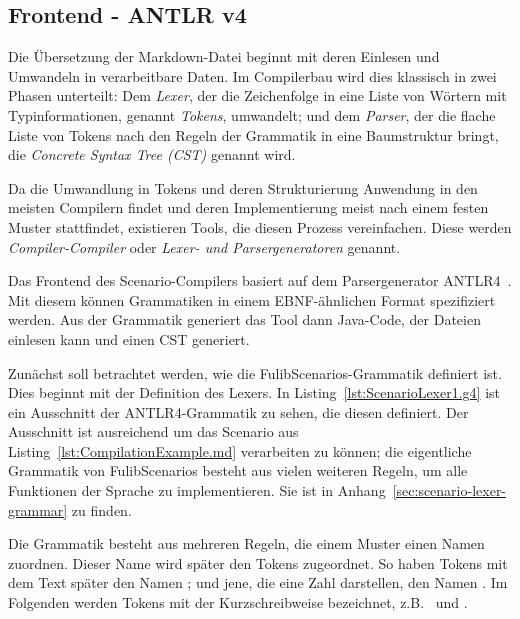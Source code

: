 \subsection{Frontend - ANTLR v4}\label{subsec:frontend-antlr4}

Die Übersetzung der Markdown-Datei beginnt mit deren Einlesen und Umwandeln in verarbeitbare Daten.
Im Compilerbau wird dies klassisch in zwei Phasen unterteilt:
Dem \emph{Lexer}, der die Zeichenfolge in eine Liste von Wörtern mit Typinformationen, genannt \emph{Tokens}, umwandelt;
und dem \emph{Parser}, der die flache Liste von Tokens nach den Regeln der Grammatik in eine Baumstruktur bringt,
die \emph{Concrete Syntax Tree (CST)} genannt wird.

Da die Umwandlung in Tokens und deren Strukturierung Anwendung in den meisten Compilern findet
und deren Implementierung meist nach einem festen Muster stattfindet,
existieren Tools, die diesen Prozess vereinfachen.
Diese werden \emph{Compiler-Compiler} oder \emph{Lexer- und Parsergeneratoren} genannt.

Das Frontend des Scenario-Compilers basiert auf dem Parsergenerator ANTLR4~\cite{antlr4-reference}.
Mit diesem können Grammatiken in einem EBNF-ähnlichen Format spezifiziert werden.
Aus der Grammatik generiert das Tool dann Java-Code, der Dateien einlesen kann und einen CST generiert.

Zunächst soll betrachtet werden, wie die FulibScenarios-Grammatik definiert ist.
Dies beginnt mit der Definition des Lexers.
In Listing~\ref{lst:ScenarioLexer1.g4} ist ein Ausschnitt der ANTLR4-Grammatik zu sehen, die diesen definiert.
Der Ausschnitt ist ausreichend um das Scenario aus Listing~\ref{lst:CompilationExample.md} verarbeiten zu können;
die eigentliche Grammatik von FulibScenarios besteht aus vielen weiteren Regeln, um alle Funktionen der Sprache zu implementieren.
Sie ist in Anhang~\ref{sec:scenario-lexer-grammar} zu finden.


Die Grammatik besteht aus mehreren Regeln, die einem Muster einen Namen zuordnen.
Dieser Name wird später den Tokens zugeordnet.
So haben Tokens mit dem Text  später den Namen ;
und jene, die eine Zahl darstellen, den Namen .
Im Folgenden werden Tokens mit der Kurzschreibweise  bezeichnet,
z.B.\  und .

